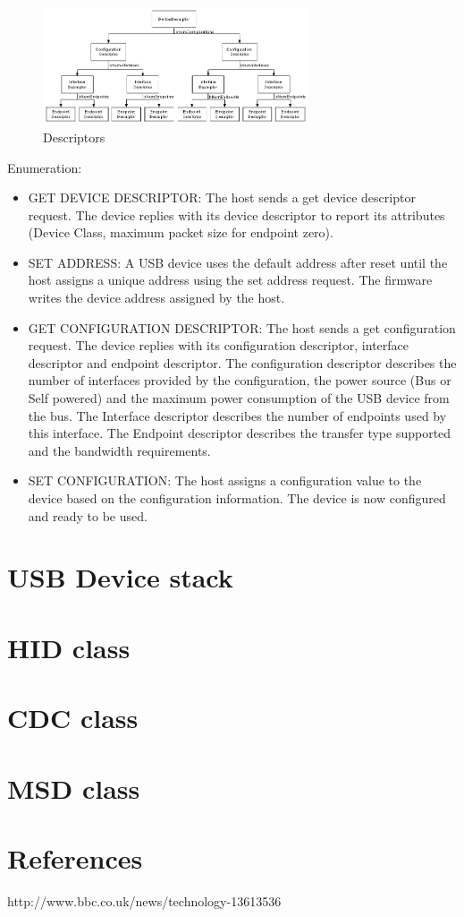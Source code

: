 \documentclass[pdftex,12pt,a4paper]{report}
\begin{document}
\begin{figure}[h!]
		\centering
		\includegraphics[width=0.7\textwidth]{./descr.jpg}
		\caption{Descriptors}
		\label{Descriptors}
\end{figure}

Enumeration:
\begin{itemize}
	\item GET DEVICE DESCRIPTOR: The host sends a get device descriptor request. The device
replies with its device descriptor to report its attributes (Device Class, maximum packet size for
endpoint zero).
	\item SET ADDRESS: A USB device uses the default address after reset until the host assigns a
unique address using the set address request. The firmware writes the device address assigned by
the host.
	\item GET CONFIGURATION DESCRIPTOR: The host sends a get configuration request. The device replies with its
configuration descriptor, interface descriptor and endpoint descriptor. The configuration
descriptor describes the number of interfaces provided by the configuration, the power source
(Bus or Self powered) and the maximum power consumption of the USB device from the bus.
The Interface descriptor describes the number of endpoints used by this interface. The Endpoint
descriptor describes the transfer type supported and the bandwidth requirements.
	\item SET CONFIGURATION: The host assigns a configuration value to the device based on the
configuration information. The device is now configured and ready to be
used.
\end{itemize}

\section{USB Device stack}

\section{HID class}
\section{CDC class}
\section{MSD class}

\section{References}
http://www.bbc.co.uk/news/technology-13613536
\end{document}
